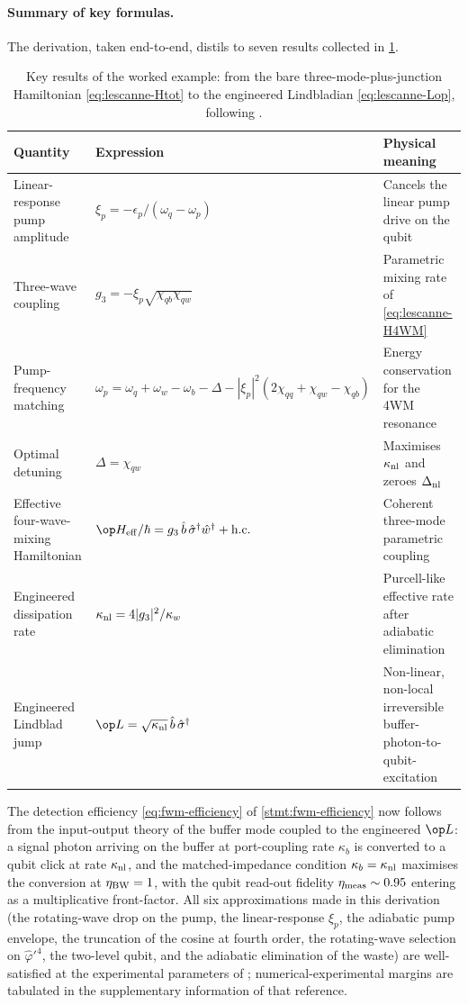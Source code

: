 \paragraph{Summary of key formulas.}
The derivation, taken end-to-end, distils to seven results
collected in \cref{tab:lescanne-summary}.
\begin{table}[h]
\centering
\renewcommand{\arraystretch}{1.25}
\begin{tabular}{p{} l p{}}
\toprule
Quantity & Expression & Physical meaning \\
\midrule
Linear-response pump amplitude & $\xi_p=-\epsilon_p/(\omega_q-\omega_p)$ & Cancels the linear pump drive on the qubit \\
Three-wave coupling & $g_3=-\xi_p\sqrt{\chi_{qb}\chi_{qw}}$ & Parametric mixing rate of \cref{eq:lescanne-H4WM} \\
Pump-frequency matching & $\omega_p=\omega_q+\omega_w-\omega_b-\Delta-|\xi_p|^2(2\chi_{qq}+\chi_{qw}-\chi_{qb})$ & Energy conservation for the 4WM resonance \\
Optimal detuning & $\Delta=\chi_{qw}$ & Maximises $\kappa_{\rm nl}$ and zeroes $\Delta_{\rm nl}$ \\
Effective four-wave-mixing Hamiltonian & $\op H_{\rm eff}/\hbar=g_3\,\hat b\,\hat\sigma^\dagger\hat w^\dagger+\hbox{h.c.}$ & Coherent three-mode parametric coupling \\
Engineered dissipation rate & $\kappa_{\rm nl}=4|g_3|^2/\kappa_w$ & Purcell-like effective rate after adiabatic elimination \\
Engineered Lindblad jump & $\op L=\sqrt{\kappa_{\rm nl}}\,\hat b\,\hat\sigma^\dagger$ & Non-linear, non-local irreversible buffer-photon-to-qubit-excitation \\
\bottomrule
\end{tabular}
\caption[]{Key results of the worked example: from the bare three-mode-plus-junction Hamiltonian \cref{eq:lescanne-Htot} to the engineered Lindbladian \cref{eq:lescanne-Lop}, following \cite{lescanne2020}.}
\label{tab:lescanne-summary}
\end{table}
The detection efficiency \cref{eq:fwm-efficiency} of
\cref{stmt:fwm-efficiency} now follows from the input-output theory
of the buffer mode coupled to the engineered $\op L$: a
signal photon arriving on the buffer at port-coupling rate
$\kappa_b$ is converted to a qubit click at rate $\kappa_{\rm nl}$,
and the matched-impedance condition $\kappa_b=\kappa_{\rm nl}$
maximises the conversion at $\eta_{\rm BW}=1$, with the qubit
read-out fidelity $\eta_{\rm meas}\sim 0.95$ entering as a
multiplicative front-factor. All six approximations made in this
derivation (the rotating-wave drop on the pump, the linear-response
$\xi_p$, the adiabatic pump envelope, the truncation of the cosine
at fourth order, the rotating-wave selection on $\hat\varphi'^4$,
the two-level qubit, and the adiabatic elimination of the waste)
are well-satisfied at the experimental parameters of
\cite{lescanne2020}; numerical-experimental margins are tabulated
in the supplementary information of that reference.

